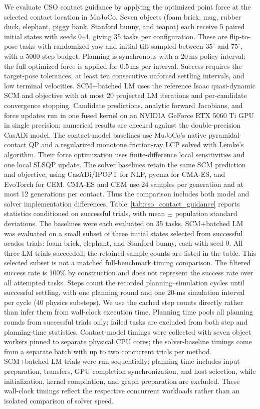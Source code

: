 We evaluate CSO contact guidance by applying the optimized point force at the selected contact location in MuJoCo. Seven objects (foam brick, mug, rubber duck, elephant, piggy bank, Stanford bunny, and teapot) each receive 5 paired initial states with seeds 0--4, giving 35 tasks per configuration. These are flip-to-pose tasks with randomized yaw and initial tilt sampled between $35^\circ$ and $75^\circ$, with a 5000-step budget. Planning is synchronous with a $20\,\mathrm{ms}$ policy interval; the full optimized force is applied for $0.5\,\mathrm{ms}$ per interval. Success requires the target-pose tolerances, at least ten consecutive unforced settling intervals, and low terminal velocities. SCM+batched LM uses the reference Isaac quasi-dynamic SCM and objective with at most 20 projected LM iterations and per-candidate convergence stopping. Candidate predictions, analytic forward Jacobians, and force updates run in one fused kernel on an NVIDIA GeForce RTX 5060 Ti GPU in single precision; numerical results are checked against the double-precision CasADi model. The contact-model baselines use MuJoCo's native pyramidal-contact QP and a regularized monotone friction-ray LCP solved with Lemke's algorithm. Their force optimization uses finite-difference local sensitivities and one local SLSQP update. The solver baselines retain the same SCM prediction and objective, using CasADi/IPOPT for NLP, pycma for CMA-ES, and EvoTorch for CEM. CMA-ES and CEM use 24 samples per generation and at most 12 generations per contact. Thus the comparison includes both model and solver implementation differences. Table~\ref{tab:cso_contact_guidance} reports statistics conditioned on successful trials, with mean $\pm$ population standard deviations. The baselines were each evaluated on 35 tasks. SCM+batched LM was evaluated on a small subset of three initial states selected from successful acados trials: foam brick, elephant, and Stanford bunny, each with seed 0. All three LM trials succeeded; the retained sample counts are listed in the table. This selected subset is not a matched full-benchmark timing comparison. The filtered success rate is 100\% by construction and does not represent the success rate over all attempted tasks. Steps count the recorded planning--simulation cycles until successful settling, with one planning round and one 20-ms simulation interval per cycle (40 physics substeps). We use the cached step counts directly rather than infer them from wall-clock execution time. Planning time pools all planning rounds from successful trials only; failed tasks are excluded from both step and planning-time statistics. Contact-model timings were collected with seven object workers pinned to separate physical CPU cores; the solver-baseline timings come from a separate batch with up to two concurrent trials per method. SCM+batched LM trials were run sequentially; planning time includes input preparation, transfers, GPU completion synchronization, and host selection, while initialization, kernel compilation, and graph preparation are excluded. These wall-clock timings reflect the respective concurrent workloads rather than an isolated comparison of solver speed.


